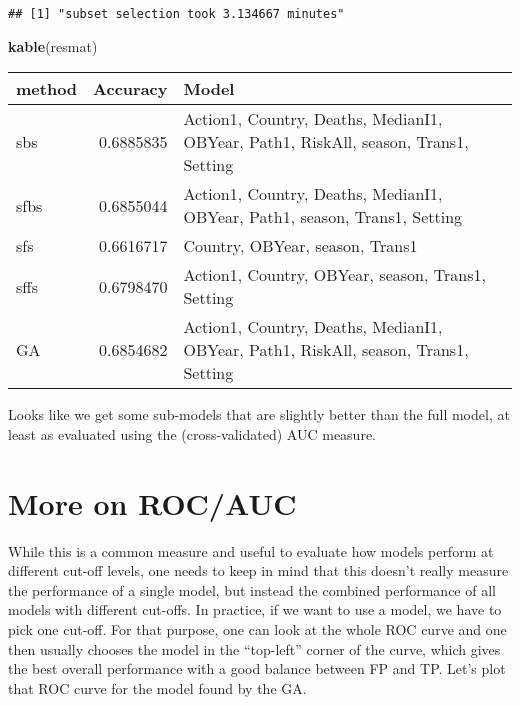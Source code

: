 \documentclass[]{article}
\newenvironment{Shaded}{\begin{snugshade}}{\end{snugshade}}
\newcommand{\CommentTok}[1]{\textcolor[rgb]{0.56,0.35,0.01}{\textit{#1}}}
\newcommand{\DataTypeTok}[1]{\textcolor[rgb]{0.13,0.29,0.53}{#1}}
\newcommand{\DecValTok}[1]{\textcolor[rgb]{0.00,0.00,0.81}{#1}}
\newcommand{\KeywordTok}[1]{\textcolor[rgb]{0.13,0.29,0.53}{\textbf{#1}}}
\newcommand{\NormalTok}[1]{#1}
\newcommand{\OperatorTok}[1]{\textcolor[rgb]{0.81,0.36,0.00}{\textbf{#1}}}
\newcommand{\StringTok}[1]{\textcolor[rgb]{0.31,0.60,0.02}{#1}}
\begin{document}
\begin{verbatim}
## [1] "subset selection took 3.134667 minutes"
\end{verbatim}

\begin{Shaded}
\begin{Highlighting}[]
\KeywordTok{kable}\NormalTok{(resmat)}
\end{Highlighting}
\end{Shaded}

\begin{longtable}[]{@{}lrl@{}}
\toprule
method & Accuracy & Model\tabularnewline
\midrule
\endhead
sbs & 0.6885835 & Action1, Country, Deaths, MedianI1, OBYear, Path1,
RiskAll, season, Trans1, Setting\tabularnewline
sfbs & 0.6855044 & Action1, Country, Deaths, MedianI1, OBYear, Path1,
season, Trans1, Setting\tabularnewline
sfs & 0.6616717 & Country, OBYear, season, Trans1\tabularnewline
sffs & 0.6798470 & Action1, Country, OBYear, season, Trans1,
Setting\tabularnewline
GA & 0.6854682 & Action1, Country, Deaths, MedianI1, OBYear, Path1,
RiskAll, season, Trans1, Setting\tabularnewline
\bottomrule
\end{longtable}

Looks like we get some sub-models that are slightly better than the full
model, at least as evaluated using the (cross-validated) AUC measure.

\hypertarget{more-on-rocauc}{%
\section{More on ROC/AUC}\label{more-on-rocauc}}

While this is a common measure and useful to evaluate how models perform
at different cut-off levels, one needs to keep in mind that this doesn't
really measure the performance of a single model, but instead the
combined performance of all models with different cut-offs. In practice,
if we want to use a model, we have to pick one cut-off. For that
purpose, one can look at the whole ROC curve and one then usually
chooses the model in the ``top-left'' corner of the curve, which gives
the best overall performance with a good balance between FP and TP.
Let's plot that ROC curve for the model found by the GA.

\begin{Shaded}
\end{Shaded}
\end{document}
